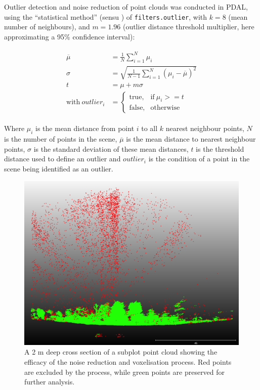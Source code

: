 \documentclass[11pt,a4paper]{article}
\begin{document}
Outlier detection and noise reduction of point clouds was conducted in PDAL, using the ``statistical method'' (sensu \citealt{Rusu2008}) of \texttt{filters.outlier}, with $k = 8$ (mean number of neighbours), and $m = 1.96$ (outlier distance threshold multiplier, here approximating a 95\% confidence interval):

\begin{align}
\begin{split}
	\overline{\mu} &= \frac{1}{N} \sum_{i=1}^{N} \mu_{i} \\
	\sigma &= \sqrt{\frac{1}{N-1} \sum_{i=1}^{N}(\mu_{i} - \overline{\mu{}})^2} \\
	t &= \mu + m \sigma \\
	\text{with}\ outlier_{i} &= 
		\begin{cases}
			\text{true},& \text{if}\ \mu_{i} >= t \\
			\text{false},& \text{otherwise}
		\end{cases}
\end{split}
\end{align}

Where $\mu_{i}$ is the mean distance from point $i$ to all $k$ nearest neighbour points, $N$ is the number of points in the scene, $\overline{\mu}$ is the mean distance to nearest neighbour points, $\sigma$ is the standard deviation of these mean distances, $t$ is the threshold distance used to define an outlier and $outlier_{i}$ is the condition of a point in the scene being identified as an outlier.

\begin{figure}
\centering
	\includegraphics[width=\linewidth]{noise_vis}
	\caption{A 2 m deep cross section of a subplot point cloud showing the efficacy of the noise reduction and voxelisation process. Red points are excluded by the process, while green points are preserved for further analysis.}
	\label{noise_vis}
\end{figure}
\end{document}

